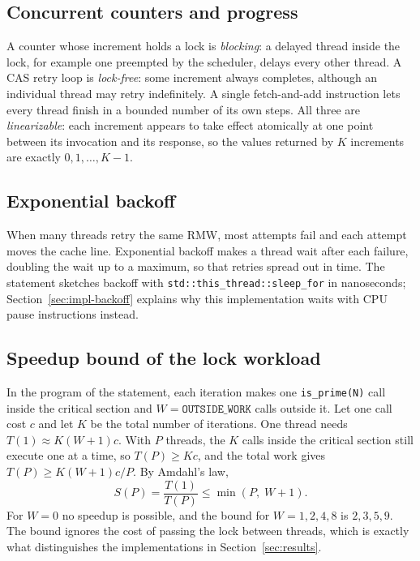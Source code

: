 \subsection{Concurrent counters and progress}\label{sec:bg-counters}

A counter whose increment holds a lock is \emph{blocking}: a delayed thread inside the lock, for example one preempted by the scheduler, delays every other thread. A CAS retry loop is \emph{lock-free}: some increment always completes, although an individual thread may retry indefinitely. A single fetch-and-add instruction lets every thread finish in a bounded number of its own steps. All three are \emph{linearizable}: each increment appears to take effect atomically at one point between its invocation and its response, so the values returned by $K$ increments are exactly $0,1,\dots,K-1$.

\subsection{Exponential backoff}\label{sec:bg-backoff}

When many threads retry the same RMW, most attempts fail and each attempt moves the cache line. Exponential backoff makes a thread wait after each failure, doubling the wait up to a maximum, so that retries spread out in time. The statement\cite{r1} sketches backoff with \texttt{std::this\_thread::sleep\_for} in nanoseconds; Section~\ref{sec:impl-backoff} explains why this implementation waits with CPU pause instructions instead.

\subsection{Speedup bound of the lock workload}\label{sec:amdahl}

In the program of the statement, each iteration makes one \texttt{is\_prime(N)} call inside the critical section and $W=\texttt{OUTSIDE\_WORK}$ calls outside it. Let one call cost $c$ and let $K$ be the total number of iterations. One thread needs $T(1)\approx K(W+1)c$. With $P$ threads, the $K$ calls inside the critical section still execute one at a time, so $T(P)\ge Kc$, and the total work gives $T(P)\ge K(W+1)c/P$. By Amdahl's law\cite{r6},
\begin{equation}
  S(P)=\frac{T(1)}{T(P)}\le\min\left(P,\;W+1\right).\label{eq:amdahl}
\end{equation}
For $W=0$ no speedup is possible, and the bound for $W=1,2,4,8$ is $2,3,5,9$. The bound ignores the cost of passing the lock between threads, which is exactly what distinguishes the implementations in Section~\ref{sec:results}.
